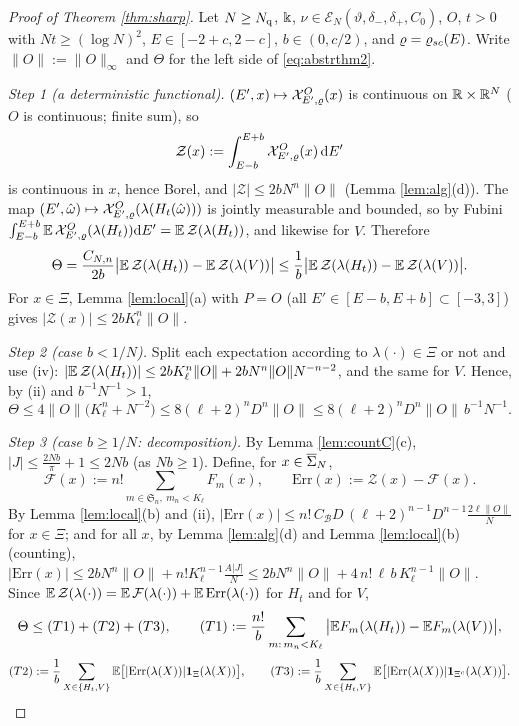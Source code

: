 \begin{proof}[Proof of Theorem \ref{thm:sharp}]
Let $N\ge N_{\rm q}$, $\Bbbk$, $\nu\in\mathcal E_N(\vartheta,\delta_-,\delta_+,C_0)$, $O$, $t>0$ with $Nt\ge(\log N)^2$, $E\in[-2+c,2-c]$, $b\in(0,c/2)$, and $\varrho=\varrho_{sc}(E)$. Write $\|O\|:=\|O\|_\infty$ and $\Theta$ for the left side of \eqref{eq:abstrthm2}.

\emph{Step 1 (a deterministic functional).} $(E',x)\mapsto\mathcal{X}^O_{E',\varrho}(x)$ is continuous on $\mathbb{R}\times\mathbb{R}^N$ ($O$ is continuous; finite sum), so
\[
\mathcal Z(x):=\int_{E-b}^{E+b}\mathcal{X}^O_{E',\varrho}(x)\,\mathrm{d} E'
\]
is continuous in $x$, hence Borel, and $|\mathcal Z|\le2bN^n\|O\|$ (Lemma \ref{lem:alg}(d)). The map $(E',\hat\omega)\mapsto\mathcal{X}^O_{E',\varrho}(\lambda(H_t(\hat\omega)))$ is jointly measurable and bounded, so by Fubini
$\int_{E-b}^{E+b}\mathbb{E}\,\mathcal{X}^O_{E',\varrho}(\lambda(H_t))\mathrm{d} E'=\mathbb{E}\,\mathcal Z(\lambda(H_t))$, and likewise for $V$. Therefore
\[
\Theta=\frac{C_{N,n}}{2b}\big|\mathbb{E}\,\mathcal Z(\lambda(H_t))-\mathbb{E}\,\mathcal Z(\lambda(V))\big|\le\frac1b\big|\mathbb{E}\,\mathcal Z(\lambda(H_t))-\mathbb{E}\,\mathcal Z(\lambda(V))\big| .
\]
For $x\in\Xi$, Lemma \ref{lem:local}(a) with $P=O$ (all $E'\in[E-b,E+b]\subset[-3,3]$) gives $|\mathcal Z(x)|\le2bK_\ell^n\|O\|$.

\emph{Step 2 (case $b<1/N$).} Split each expectation according to $\lambda(\cdot)\in\Xi$ or not and use (iv):
$|\mathbb{E}\,\mathcal Z(\lambda(H_t))|\le2bK_\ell^n\|O\|+2bN^n\|O\|N^{-n-2}$, and the same for $V$. Hence, by (ii) and $b^{-1}N^{-1}>1$,
\[
\Theta\le4\|O\|\big(K_\ell^n+N^{-2}\big)\le8(\ell+2)^nD^n\|O\|\le8(\ell+2)^nD^n\|O\|\,b^{-1}N^{-1}.
\]

\emph{Step 3 (case $b\ge1/N$: decomposition).} By Lemma \ref{lem:countC}(c), $|J|\le\frac{2Nb}\pi+1\le2Nb$ (as $Nb\ge1$). Define, for $x\in\overline{\Sigma}_N$,
\[
\mathcal F(x):=n!\sum_{m\in\mathfrak S_n,\ m_n<K_\ell}F_m(x),\qquad\mathrm{Err}(x):=\mathcal Z(x)-\mathcal F(x).
\]
By Lemma \ref{lem:local}(b) and (ii), $|\mathrm{Err}(x)|\le n!\,C_{\mathcal B}D\,(\ell+2)^{n-1}D^{n-1}\frac{2\ell\|O\|}N$ for $x\in\Xi$; and for all $x$, by Lemma \ref{lem:alg}(d) and Lemma \ref{lem:local}(b) (counting), $|\mathrm{Err}(x)|\le2bN^n\|O\|+n!K_\ell^{n-1}\frac{A|J|}N\le2bN^n\|O\|+4\,n!\,\ell\,b\,K_\ell^{n-1}\|O\|$.
Since $\mathbb{E}\,\mathcal Z(\lambda(\cdot))=\mathbb{E}\,\mathcal F(\lambda(\cdot))+\mathbb{E}\,\mathrm{Err}(\lambda(\cdot))$ for $H_t$ and for $V$,
\[
\Theta\le(T1)+(T2)+(T3),\qquad (T1):=\frac{n!}b\sum_{m:\,m_n<K_\ell}\big|\mathbb{E} F_m(\lambda(H_t))-\mathbb{E} F_m(\lambda(V))\big|,
\]
\[
(T2):=\frac1b\sum_{X\in\{H_t,V\}}\mathbb{E}\big[|\mathrm{Err}(\lambda(X))|\mathbf 1_{\Xi}(\lambda(X))\big],\qquad(T3):=\frac1b\sum_{X\in\{H_t,V\}}\mathbb{E}\big[|\mathrm{Err}(\lambda(X))|\mathbf 1_{\Xi^c}(\lambda(X))\big].
\]


\end{proof}
